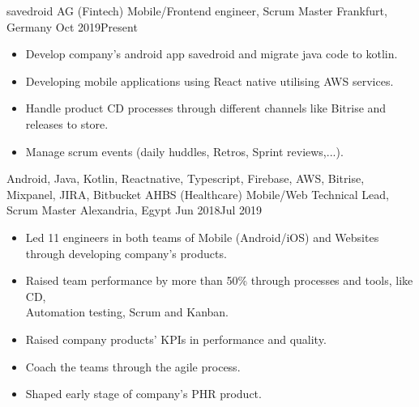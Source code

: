 %
%
%
\vspace{0.1cm}
\begin{experiences}
    \experience
        {savedroid AG (Fintech)}   {Mobile/Frontend engineer, Scrum Master}
        {Frankfurt, Germany}
        {Oct 2019}{Present}
        {
            \begin{itemize}
                \item Develop company's android app savedroid and migrate java code to kotlin.                        
                \item Developing mobile applications using React native utilising AWS services.                    
                \item Handle product CD processes through different channels like
                Bitrise and releases to store.                
                \item Manage scrum events (daily huddles, Retros, Sprint reviews,...).                                                                    
            \end{itemize}
        }
        {Android, Java, Kotlin, Reactnative, Typescript, Firebase, AWS, Bitrise, Mixpanel, JIRA, Bitbucket}
    \emptySeparator
    \experience
        {AHBS (Healthcare)}   {Mobile/Web Technical Lead, Scrum Master}
        {Alexandria, Egypt}
        {Jun 2018}{Jul 2019}
            {
                \begin{itemize}
                    \item Led 11 engineers in both teams of Mobile (Android/iOS)
                    and Websites through developing company’s products.                           
                    \item Raised team performance by more than 50\% through processes
                    and tools, like CD, \\Automation testing, Scrum and Kanban.
                    \item Raised company products’ KPIs in performance and quality.  
                    \item Coach the teams through the agile process.                
                    \item Shaped early stage of company's PHR product.

\end{itemize}}
\end{experiences}
